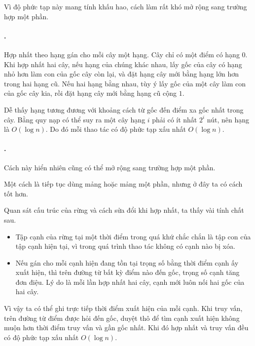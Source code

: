 \documentclass[11pt]{article}
\begin{document}
Vì độ phức tạp này mang tính khấu hao, cách làm rất khó mở rộng sang trường
hợp  một phần.

\paragraph{.}
Hợp nhất theo hạng gán cho mỗi cây một hạng. Cây chỉ có một điểm có hạng \(0\).
Khi hợp nhất hai cây, nếu hạng của chúng khác nhau, lấy gốc của cây có hạng
nhỏ hơn làm con của gốc cây còn lại, và đặt hạng cây mới bằng hạng lớn hơn
trong hai hạng cũ. Nếu hai hạng bằng nhau, tùy ý lấy gốc của một cây làm con
của gốc cây kia, rồi đặt hạng cây mới bằng hạng cũ cộng \(1\).

Dễ thấy hạng tương đương với khoảng cách từ gốc đến điểm xa gốc nhất trong
cây. Bằng quy nạp có thể suy ra một cây hạng \(i\) phải có ít nhất \(2^i\)
nút, nên hạng là \(O(\log n)\). Do đó mỗi thao tác có độ phức tạp xấu nhất
\(O(\log n)\).

\paragraph{.}
Cách này hiển nhiên cũng có thể mở rộng sang trường hợp  một
phần.

Một cách là tiếp tục dùng mảng  hoặc mảng 
một phần, nhưng ở đây ta có cách tốt hơn.

Quan sát cấu trúc của rừng và cách sửa đổi khi hợp nhất, ta thấy vài tính
chất sau.

\begin{itemize}
  \item Tập cạnh của rừng tại một thời điểm trong quá khứ chắc chắn là tập con
  của tập cạnh hiện tại, vì trong quá trình thao tác không có cạnh nào bị xóa.
  \item Nếu gán cho mỗi cạnh hiện đang tồn tại trọng số bằng thời điểm cạnh ấy
  xuất hiện, thì trên đường từ bất kỳ điểm nào đến gốc, trọng số cạnh tăng đơn
  điệu. Lý do là mỗi lần hợp nhất hai cây, cạnh mới luôn nối hai gốc của hai
  cây.
\end{itemize}

Vì vậy ta có thể ghi trực tiếp thời điểm xuất hiện của mỗi cạnh. Khi truy vấn,
trên đường từ điểm được hỏi đến gốc, duyệt thô để tìm cạnh xuất hiện không
muộn hơn thời điểm truy vấn và gần gốc nhất. Khi đó hợp nhất và truy vấn đều
có độ phức tạp xấu nhất \(O(\log n)\).
\end{document}
